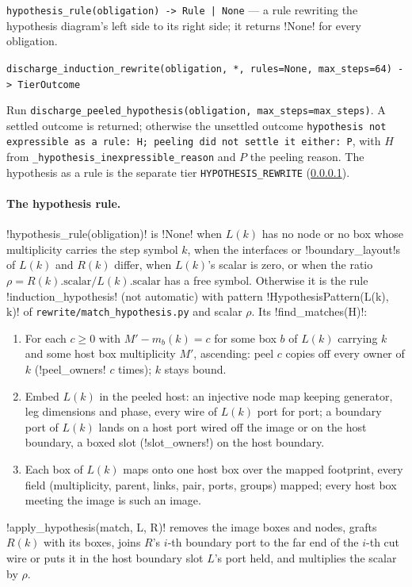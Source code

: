 \begin{signature}
\texttt{hypothesis\_\allowbreak{}rule(\allowbreak{}obligation) -> Rule | None} --- a rule rewriting the hypothesis diagram's left side to its right side; it returns \py!None! for every obligation.

\texttt{discharge\_\allowbreak{}induction\_\allowbreak{}rewrite(\allowbreak{}obligation,\allowbreak{} *,\allowbreak{} rules=None,\allowbreak{} max\_\allowbreak{}steps=64) -> TierOutcome}

Run \texttt{discharge\_\allowbreak{}peeled\_\allowbreak{}hypothesis(\allowbreak{}obligation,\allowbreak{} max\_\allowbreak{}steps=max\_\allowbreak{}steps)}. A settled outcome is returned; otherwise the unsettled outcome \texttt{hypothesis not expressible as a rule: H; peeling did not settle it either: P}, with $H$ from \texttt{\_\allowbreak{}hypothesis\_\allowbreak{}inexpressible\_\allowbreak{}reason} and $P$ the peeling reason. The hypothesis as a rule is the separate tier \texttt{HYPOTHESIS\_REWRITE} (\cref{sec:kernel-tier-hypothesis}).

\paragraph{The hypothesis rule.}\label{sec:kernel-tier-hypothesis} \py!hypothesis_rule(obligation)! is \py!None! when $L(k)$ has no node or no box whose multiplicity carries the step symbol $k$, when the interfaces or \py!boundary_layout!s of $L(k)$ and $R(k)$ differ, when $L(k)$'s scalar is zero, or when the ratio $\rho = R(k).\text{scalar}/L(k).\text{scalar}$ has a free symbol. Otherwise it is the rule \code!induction_hypothesis! (not automatic) with pattern \py!HypothesisPattern(L(k), k)! of \texttt{rewrite/match\_hypothesis.py} and scalar $\rho$. Its \py!find_matches(H)!:
\begin{enumerate}
\item For each $c\ge 0$ with $M' - m_b(k) = c$ for some box $b$ of $L(k)$ carrying $k$ and some host box multiplicity $M'$, ascending: peel $c$ copies off every owner of $k$ (\py!peel_owners! $c$ times); $k$ stays bound.
\item Embed $L(k)$ in the peeled host: an injective node map keeping generator, leg dimensions and phase, every wire of $L(k)$ port for port; a boundary port of $L(k)$ lands on a host port wired off the image or on the host boundary, a boxed slot (\py!slot_owners!) on the host boundary.
\item Each box of $L(k)$ maps onto one host box over the mapped footprint, every field (multiplicity, parent, links, pair, ports, groups) mapped; every host box meeting the image is such an image.
\end{enumerate}
\py!apply_hypothesis(match, L, R)! removes the image boxes and nodes, grafts $R(k)$ with its boxes, joins $R$'s $i$-th boundary port to the far end of the $i$-th cut wire or puts it in the host boundary slot $L$'s port held, and multiplies the scalar by $\rho$.


\end{signature}
